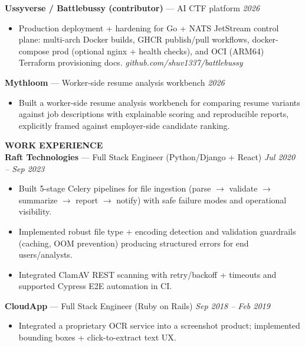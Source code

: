 \documentclass[10pt]{article}
\begin{document}
\textbf{Ussyverse / Battlebussy (contributor)} --- AI CTF platform \hfill \textit{2026}\\
\vspace{-6pt}
\begin{itemize}
  \setlength\itemsep{-2pt}
  \setlength\parskip{0pt}
  \setlength\parsep{0pt}
  \item Production deployment + hardening for Go + NATS JetStream control plane: multi-arch Docker builds, GHCR publish/pull workflows, docker-compose prod (optional nginx + health checks), and OCI (ARM64) Terraform provisioning docs. \textit{github.com/shuv1337/battlebussy}
\end{itemize}

\textbf{Mythloom} --- Worker-side resume analysis workbench \hfill \textit{2026}\\
\vspace{-6pt}
\begin{itemize}
  \setlength\itemsep{-2pt}
  \setlength\parskip{0pt}
  \setlength\parsep{0pt}
  \item Built a worker-side resume analysis workbench for comparing resume variants against job descriptions with explainable scoring and reproducible reports, explicitly framed against employer-side candidate ranking.
\end{itemize}

\vspace{6pt}
\textbf{WORK EXPERIENCE}\\

\textbf{Raft Technologies} --- Full Stack Engineer (Python/Django + React) \hfill \textit{Jul 2020 -- Sep 2023}\\
\vspace{-6pt}
\begin{itemize}
  \setlength\itemsep{-2pt}
  \setlength\parskip{0pt}
  \setlength\parsep{0pt}
  \item Built 5-stage Celery pipelines for file ingestion (parse $\rightarrow$ validate $\rightarrow$ summarize $\rightarrow$ report $\rightarrow$ notify) with safe failure modes and operational visibility.
  \item Implemented robust file type + encoding detection and validation guardrails (caching, OOM prevention) producing structured errors for end users/analysts.
  \item Integrated ClamAV REST scanning with retry/backoff + timeouts and supported Cypress E2E automation in CI.
\end{itemize}

\textbf{CloudApp} --- Full Stack Engineer (Ruby on Rails) \hfill \textit{Sep 2018 -- Feb 2019}\\
\vspace{-6pt}
\begin{itemize}
  \setlength\itemsep{-2pt}
  \setlength\parskip{0pt}
  \setlength\parsep{0pt}
  \item Integrated a proprietary OCR service into a screenshot product; implemented bounding boxes + click-to-extract text UX.
\end{itemize}
\end{document}
